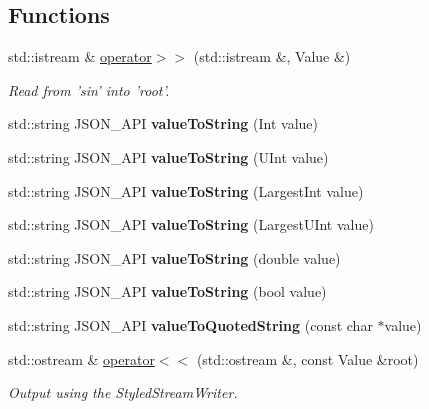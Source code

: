 \subsection*{Functions}
\begin{DoxyCompactItemize}
\item 
std\+::istream \& \hyperlink{namespace_json_a4d245ef719cc0853e8e78eb5f99c16e5}{operator$>$$>$} (std\+::istream \&, Value \&)
\begin{DoxyCompactList}\small\item\em Read from 'sin' into 'root'. \end{DoxyCompactList}\item 
\hypertarget{namespace_json_a5d3eba6789f9a9c1ab563ff8b4a5090f}{std\+::string J\+S\+O\+N\+\_\+\+A\+P\+I {\bfseries value\+To\+String} (Int value)}\label{namespace_json_a5d3eba6789f9a9c1ab563ff8b4a5090f}

\item 
\hypertarget{namespace_json_a4d43b0ff222bd3975bcf1babca0b978f}{std\+::string J\+S\+O\+N\+\_\+\+A\+P\+I {\bfseries value\+To\+String} (U\+Int value)}\label{namespace_json_a4d43b0ff222bd3975bcf1babca0b978f}

\item 
\hypertarget{namespace_json_abd9c650f70d9434f98f9025e2e2faf2d}{std\+::string J\+S\+O\+N\+\_\+\+A\+P\+I {\bfseries value\+To\+String} (Largest\+Int value)}\label{namespace_json_abd9c650f70d9434f98f9025e2e2faf2d}

\item 
\hypertarget{namespace_json_a3f46b0bc62b95a9426a2da0117bdf9f0}{std\+::string J\+S\+O\+N\+\_\+\+A\+P\+I {\bfseries value\+To\+String} (Largest\+U\+Int value)}\label{namespace_json_a3f46b0bc62b95a9426a2da0117bdf9f0}

\item 
\hypertarget{namespace_json_a99995d7dafa4f4970b349d7d3c8d1d99}{std\+::string J\+S\+O\+N\+\_\+\+A\+P\+I {\bfseries value\+To\+String} (double value)}\label{namespace_json_a99995d7dafa4f4970b349d7d3c8d1d99}

\item 
\hypertarget{namespace_json_a979ed531f091985e22f0051cd2a8e341}{std\+::string J\+S\+O\+N\+\_\+\+A\+P\+I {\bfseries value\+To\+String} (bool value)}\label{namespace_json_a979ed531f091985e22f0051cd2a8e341}

\item 
\hypertarget{namespace_json_aa0c8235a4a5c6599da5d3332743db8ac}{std\+::string J\+S\+O\+N\+\_\+\+A\+P\+I {\bfseries value\+To\+Quoted\+String} (const char $\ast$value)}\label{namespace_json_aa0c8235a4a5c6599da5d3332743db8ac}

\item 
std\+::ostream \& \hyperlink{namespace_json_a87bc83d7e90fc666d28aa16727deda2f}{operator$<$$<$} (std\+::ostream \&, const Value \&root)
\begin{DoxyCompactList}\small\item\em Output using the Styled\+Stream\+Writer. \end{DoxyCompactList}\end{DoxyCompactItemize}


